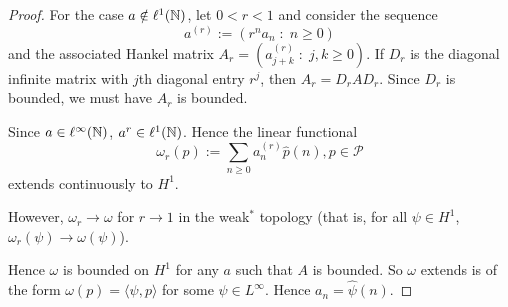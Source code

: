 \documentclass{unswmaths}
\begin{document}
\begin{proof}
        For the case $a \notin \ell^1(\mathbb{N})$, let $0 < r < 1$ and consider the sequence
        \begin{equation*}
            a^{(r)} := (r^na_n\;:\;n\geq 0)
        \end{equation*}
        and the associated Hankel matrix $A_r = (a^{(r)}_{j+k}\;:\;j,k\geq 0)$.
        If $D_r$ is the diagonal infinite matrix with $j$th diagonal entry $r^j$, then
        $A_r = D_r A D_r$. Since $D_r$ is bounded, we must have $A_r$ is bounded.
        
        Since $a \in \ell^\infty(\mathbb{N})$, $a^{r} \in \ell^1(\mathbb{N})$. Hence the linear functional
        \begin{equation*}
            \omega_r(p) := \sum_{n\geq 0} a^{(r)}_n\hat{p}(n), p \in \mathcal{P}
        \end{equation*}
        extends continuously to $H^1$.
        
        However, $\omega_r \rightarrow \omega$ for $r\rightarrow 1$ in the weak$^*$ topology (that is,
        for all $\psi \in H^1$, $\omega_r(\psi)\rightarrow \omega(\psi)$).
        
        Hence $\omega$ is bounded on $H^1$ for any $a$ such that $A$ is bounded.
        So $\omega$ extends is of the form $\omega(p) = \langle \psi,p\rangle$
        for some $\psi \in L^\infty$. Hence $a_n = \hat{\psi}(n)$.
        
        
        
    \end{proof}
    
\end{document}
